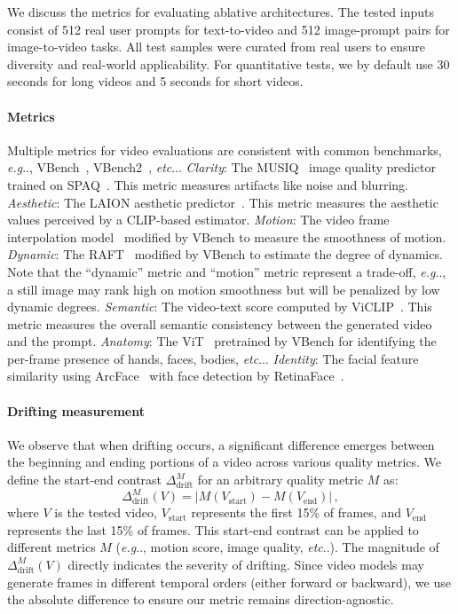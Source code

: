 \documentclass{article}
\makeatletter
\DeclareRobustCommand\onedot{\futurelet\@let@token\@onedot}
\def\@onedot{\ifx\@let@token.\else.\null\fi\xspace}
\def\eg{\emph{e.g}\onedot}
\def\etc{\emph{etc}\onedot}
\makeatother
\begin{document}
We discuss the metrics for evaluating ablative architectures. The tested inputs consist of 512 real user prompts for text-to-video and 512 image-prompt pairs for image-to-video tasks. All test samples were curated from real users to ensure diversity and real-world applicability. For quantitative tests, we by default use 30 seconds for long videos and 5 seconds for short videos. 

\paragraph{Metrics} Multiple metrics for video evaluations are consistent with common benchmarks, \eg, VBench~\cite{huang2023vbench}, VBench2~\cite{zheng2025vbench2}, \etc.
\emph{Clarity}: The MUSIQ~\cite{ke2021musiq} image quality predictor trained on SPAQ~\cite{fang2020perceptual}. This metric measures artifacts like noise and blurring.
\emph{Aesthetic}: The LAION aesthetic predictor~\cite{schuhmann2022laion}. This metric measures the aesthetic values perceived by a CLIP-based estimator.
\emph{Motion}: The video frame interpolation model~\cite{huang2022real} modified by VBench to measure the smoothness of motion.
\emph{Dynamic}: The RAFT~\cite{teed2020raft} modified by VBench to estimate the degree of dynamics. Note that the ``dynamic'' metric and ``motion'' metric represent a trade-off, \eg, a still image may rank high on motion smoothness but will be penalized by low dynamic degrees.
\emph{Semantic}: The video-text score computed by ViCLIP~\cite{wang2023internvid}. This metric measures the overall semantic consistency between the generated video and the prompt.
\emph{Anatomy}: The ViT~\cite{dosovitskiy2020image} pretrained by VBench for identifying the per-frame presence of hands, faces, bodies, \etc.
\emph{Identity}: The facial feature similarity using ArcFace~\cite{deng2019arcface} with face detection by RetinaFace~\cite{deng2020retinaface}.

\paragraph{Drifting measurement} 

We observe that when drifting occurs, a significant difference emerges between the beginning and ending portions of a video across various quality metrics. We define the start-end contrast $\Delta_{\text{drift}}^M$ for an arbitrary quality metric $M$ as:
\begin{equation}
\Delta_{\text{drift}}^M(V) = \left| M(V_{\text{start}}) - M(V_{\text{end}}) \right|\,, 
\end{equation}
where $V$ is the tested video, $V_{\text{start}}$ represents the first 15\% of frames, and $V_{\text{end}}$ represents the last 15\% of frames. This start-end contrast can be applied to different metrics $M$ (\eg, motion score, image quality, \etc). The magnitude of $\Delta_{\text{drift}}^M(V)$ directly indicates the severity of drifting. Since video models may generate frames in different temporal orders (either forward or backward), we use the absolute difference to ensure our metric remains direction-agnostic.
\end{document}
